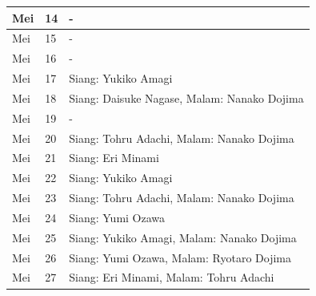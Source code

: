 \begin{table}[H]
\begin{center}
\begin{tabular}{ | p{} | p{} | p{} | }
            \hline
            Mei            & 14            & -                                               \\
            \hline
            Mei            & 15            & -                                               \\
            \hline
            Mei            & 16            & -                                               \\
            \hline
            Mei            & 17            & Siang: Yukiko Amagi                             \\
            \hline
            Mei            & 18            & Siang: Daisuke Nagase, Malam: Nanako Dojima     \\
            \hline
            Mei            & 19            & -                                               \\
            \hline
            Mei            & 20            & Siang: Tohru Adachi, Malam: Nanako Dojima       \\
            \hline
            Mei            & 21            & Siang: Eri Minami                               \\
            \hline
            Mei            & 22            & Siang: Yukiko Amagi                             \\
            \hline
            Mei            & 23            & Siang: Tohru Adachi, Malam: Nanako Dojima       \\
            \hline
            Mei            & 24            & Siang: Yumi Ozawa                               \\
            \hline
            Mei            & 25            & Siang: Yukiko Amagi, Malam: Nanako Dojima       \\
            \hline
            Mei            & 26            & Siang: Yumi Ozawa, Malam: Ryotaro Dojima        \\
            \hline
            Mei            & 27            & Siang: Eri Minami, Malam: Tohru Adachi          \\
            \hline
        \end{tabular}
    \end{center}
\end{table}



